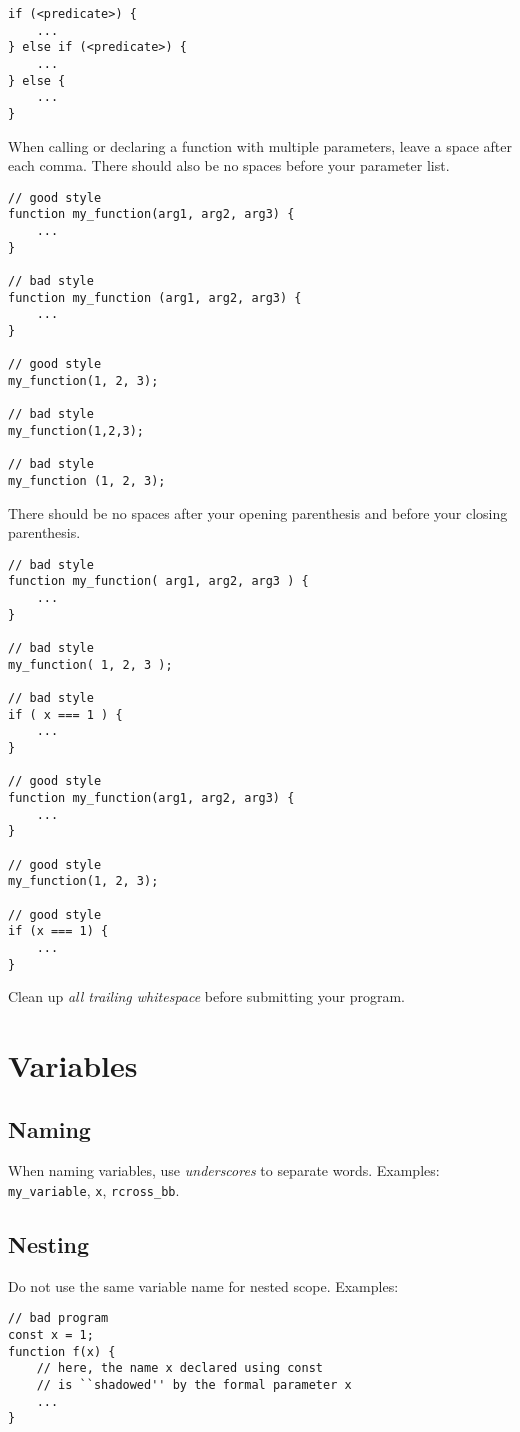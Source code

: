 \begin{lstlisting}
if (<predicate>) {
    ...
} else if (<predicate>) {
    ...
} else {
    ...
}
\end{lstlisting}

  When calling or declaring a function with multiple parameters, leave a space after each comma.
  There should also be no spaces before your parameter list.

\begin{lstlisting}
// good style
function my_function(arg1, arg2, arg3) {
    ...
}

// bad style
function my_function (arg1, arg2, arg3) {
    ...
}

// good style
my_function(1, 2, 3);

// bad style
my_function(1,2,3);

// bad style
my_function (1, 2, 3);
\end{lstlisting}

  There should be no spaces after your opening parenthesis and before your closing parenthesis.
  
\begin{lstlisting}
// bad style
function my_function( arg1, arg2, arg3 ) {
    ...
}

// bad style
my_function( 1, 2, 3 );

// bad style
if ( x === 1 ) {
    ...
}

// good style
function my_function(arg1, arg2, arg3) {
    ...
}

// good style
my_function(1, 2, 3);

// good style
if (x === 1) {
    ...
}
\end{lstlisting}

  Clean up \emph{all trailing whitespace} before submitting your program.

\section*{Variables}
\subsection*{Naming}
When naming variables, use \emph{underscores} to separate words. Examples: \lstinline{my_variable}, \lstinline{x}, \lstinline{rcross_bb}.

\subsection*{Nesting}
Do not use the same variable name for nested scope. Examples:
\begin{lstlisting}
// bad program
const x = 1;
function f(x) {
    // here, the name x declared using const
    // is ``shadowed'' by the formal parameter x
    ...
}
\end{lstlisting}

